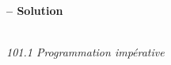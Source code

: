 \documentclass[10pt, a4paper, answers]{\path exam}
\begin{document}
{
\begin{center}

\ifprintanswers{}
	\huge{\textbf{\shorttitle -- Solution}}\\
\else
	\huge{\textbf{\thetitle}}\\
\fi
 
\large \textit {101.1 Programmation impérative}\\
\end{center}
} 
\end{document}
